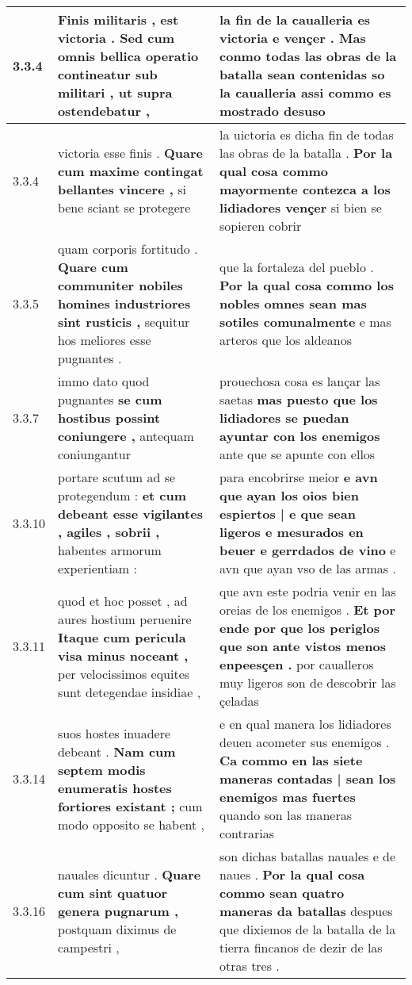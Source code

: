 \begin{tabular}{|p{1cm}|p{6.5cm}|p{6.5cm}|}
3.3.4 & Finis militaris , est victoria . \textbf{ Sed cum omnis bellica operatio contineatur sub militari , } ut supra ostendebatur , & la fin de la caualleria es victoria e vençer . \textbf{ Mas conmo todas las obras de la batalla sean contenidas so la caualleria } assi commo es mostrado desuso \\\hline
3.3.4 & victoria esse finis . \textbf{ Quare cum maxime contingat bellantes vincere , } si bene sciant se protegere & la uictoria es dicha fin de todas las obras de la batalla . \textbf{ Por la qual cosa commo mayormente contezca a los lidiadores vençer } si bien se sopieren cobrir \\\hline
3.3.5 & quam corporis fortitudo . \textbf{ Quare cum communiter nobiles homines industriores sint rusticis , } sequitur hos meliores esse pugnantes . & que la fortaleza del pueblo . \textbf{ Por la qual cosa commo los nobles omnes sean mas sotiles comunalmente } e mas arteros que los aldeanos \\\hline
3.3.7 & immo dato quod pugnantes \textbf{ se cum hostibus possint coniungere , } antequam coniungantur & prouechosa cosa es lançar las saetas \textbf{ mas puesto que los lidiadores se puedan ayuntar con los enemigos } ante que se apunte con ellos \\\hline
3.3.10 & portare scutum ad se protegendum : \textbf{ et cum debeant esse vigilantes , agiles , sobrii , } habentes armorum experientiam : & para encobrirse meior \textbf{ e avn que ayan los oios bien espiertos | e que sean ligeros e mesurados en beuer e gerrdados de vino } e avn que ayan vso de las armas . \\\hline
3.3.11 & quod et hoc posset , ad aures hostium peruenire \textbf{ Itaque cum pericula visa minus noceant , } per velocissimos equites sunt detegendae insidiae , & que avn este podria venir en las oreias de los enemigos . \textbf{ Et por ende por que los periglos que son ante vistos menos enpeesçen . } por caualleros muy ligeros son de descobrir las çeladas \\\hline
3.3.14 & suos hostes inuadere debeant . \textbf{ Nam cum septem modis enumeratis hostes fortiores existant ; } cum modo opposito se habent , & e en qual manera los lidiadores deuen acometer sus enemigos . \textbf{ Ca commo en las siete maneras contadas | sean los enemigos mas fuertes } quando son las maneras contrarias \\\hline
3.3.16 & nauales dicuntur . \textbf{ Quare cum sint quatuor genera pugnarum , } postquam diximus de campestri , & son dichas batallas nauales e de naues . \textbf{ Por la qual cosa commo sean quatro maneras da batallas } despues que dixiemos de la batalla de la tierra fincanos de dezir de las otras tres . \\\hline

\end{tabular}

